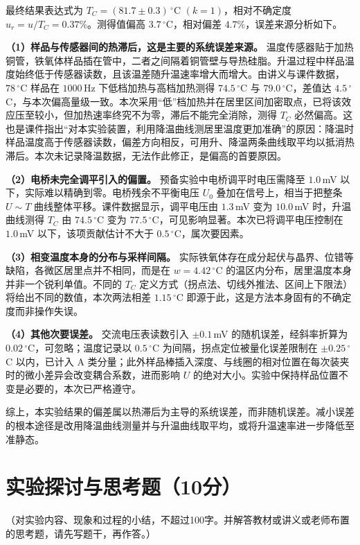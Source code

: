 \documentclass{Phyport}
\begin{document}
最终结果表达式为 $T_C=(81.7\pm 0.3)\,^\circ$C $(k=1)$，相对不确定度 $u_r=u/T_C=0.37\%$。测得值偏高 $3.7\,^\circ$C，相对偏差 $4.7\%$，误差来源分析如下。

\textbf{（1）样品与传感器间的热滞后，这是主要的系统误差来源。}
温度传感器贴于加热铜管，铁氧体样品插在管中，二者之间隔着铜管壁与导热硅脂。升温过程中样品温度始终低于传感器读数，且该温差随升温速率增大而增大。由讲义与课件数据，$78\,^\circ$C 样品在 $1000$\,Hz 下低档加热与高档加热测得 $74.5\,^\circ$C 与 $79.0\,^\circ$C，差值达 $4.5\,^\circ$C，与本次偏高量级一致。本次采用“低”档加热并在居里区间加密取点，已将该效应压至较小，但加热速率终究不为零，滞后不能完全消除，测得 $T_C$ 必然偏高。这也是课件指出“对本实验装置，利用降温曲线测居里温度更加准确”的原因：降温时样品温度高于传感器读数，偏差方向相反，可用升、降温两条曲线取平均以抵消热滞后。本次未记录降温数据，无法作此修正，是偏高的首要原因。

\textbf{（2）电桥未完全调平引入的偏置。}
预备实验中电桥调平时电压需降至 $1.0$\,mV 以下，实际难以精确到零。电桥残余不平衡电压 $U_0$ 叠加在信号上，相当于把整条 $U\sim T$ 曲线整体平移。课件数据显示，调平电压由 $1.3$\,mV 变为 $10.0$\,mV 时，升温曲线测得 $T_C$ 由 $74.5\,^\circ$C 变为 $77.5\,^\circ$C，可见影响显著。本次已将调平电压控制在 $1.0$\,mV 以下，该项贡献估计不大于 $0.5\,^\circ$C，属次要因素。

\textbf{（3）相变温度本身的分布与采样间隔。}
实际铁氧体存在成分起伏与晶界、位错等缺陷，各微区居里点并不相同，而是在 $w=4.42\,^\circ$C 的温区内分布，居里温度本身并非一个锐利单值。不同的 $T_C$ 定义方式（拐点法、切线外推法、区间上下限法）将给出不同的数值，本次两法相差 $1.15\,^\circ$C 即源于此，这是方法本身固有的不确定度而非操作失误。

\textbf{（4）其他次要误差。}
交流电压表读数引入 $\pm 0.1$\,mV 的随机误差，经斜率折算为 $0.02\,^\circ$C，可忽略；温度记录以 $0.5\,^\circ$C 为间隔，拐点定位被量化误差限制在 $\pm 0.25\,^\circ$C 以内，已计入 A 类分量；此外样品棒插入深度、与线圈的相对位置在每次装夹时的微小差异会改变耦合系数，进而影响 $U$ 的绝对大小。实验中保持样品位置不变是必要的，本次已严格遵守。

综上，本实验结果的偏差属以热滞后为主导的系统误差，而非随机误差。减小误差的根本途径是改用降温曲线测量并与升温曲线取平均，或将升温速率进一步降低至准静态。

\section{实验探讨与思考题（10分）}
（对实验内容、现象和过程的小结，不超过100字。并解答教材或讲义或老师布置的思考题，请先写题干，再作答。）
\end{document}
